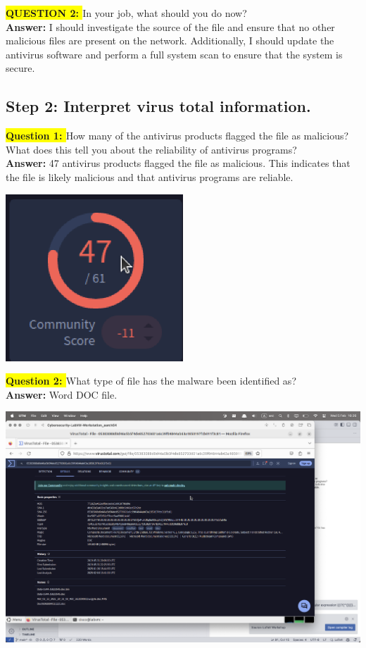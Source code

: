 \documentclass{article}
\begin{document}
\textbf{\colorbox{yellow}{QUESTION 2: }}In your job, what should you do now? \\
\textbf{Answer: } I should investigate the source of the file and ensure that no other malicious files are present on the network. Additionally, I should update the antivirus software and perform a full system scan to ensure that the system is secure.

\newpage

\subsection*{Step 2: Interpret virus total information.}

\textbf{\colorbox{yellow}{Question 1: }} How many of the antivirus products flagged the file as malicious? What does this tell you about the
reliability of antivirus programs? \\
\textbf{Answer: } 47 antivirus products flagged the file as malicious. This indicates that the file is likely malicious and that antivirus programs are reliable.

\vspace{1\baselineskip}

\includegraphics[width=0.5\textwidth]{2.png}

\vspace{2\baselineskip}

\textbf{\colorbox{yellow}{Question 2: }} What type of file has the malware been identified as? \\
\textbf{Answer: } Word DOC file. 

\vspace{1\baselineskip}

\includegraphics[width=1\textwidth]{3.png}
\end{document}

